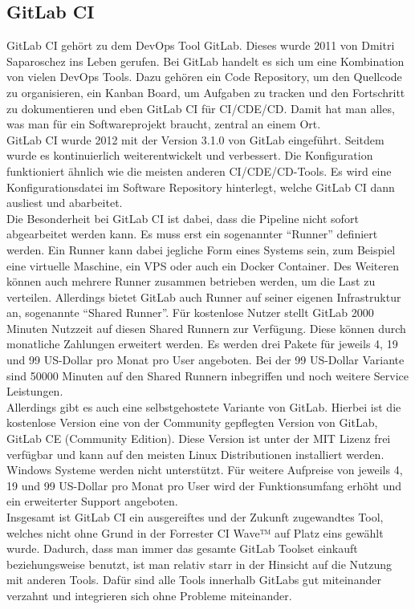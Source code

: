 \subsection{GitLab CI}
GitLab CI gehört zu dem DevOps Tool GitLab\autocite[Vgl.][]{GitLab.2019}. Dieses wurde 2011 von Dmitri Saparoschez ins Leben gerufen. Bei GitLab handelt es sich um eine Kombination von vielen DevOps Tools. Dazu gehören ein Code Repository, um den Quellcode zu organisieren, ein Kanban Board, um Aufgaben zu tracken und den Fortschritt zu dokumentieren und eben GitLab CI für \ac{CI}/\ac{CDE}/\ac{CD}\autocite[Vgl.][]{GitLab.2019}. Damit hat man alles, was man für ein Softwareprojekt braucht, zentral an einem Ort.\\ 
GitLab CI wurde 2012 mit der Version 3.1.0 von GitLab eingeführt\autocite[Vgl.][]{GitLab.2019}. Seitdem wurde es kontinuierlich weiterentwickelt und verbessert. Die Konfiguration funktioniert ähnlich wie die meisten anderen \ac{CI}/\ac{CDE}/\ac{CD}-Tools. Es wird eine Konfigurationsdatei im Software Repository hinterlegt, welche GitLab CI dann ausliest und abarbeitet.\\
 Die Besonderheit bei GitLab CI ist dabei, dass die Pipeline nicht sofort abgearbeitet werden kann. Es muss erst ein sogenannter \enquote{Runner} definiert werden. Ein Runner kann dabei jegliche Form eines Systems sein, zum Beispiel eine virtuelle Maschine, ein VPS oder auch ein Docker Container. Des Weiteren können auch mehrere Runner zusammen betrieben werden, um die Last zu verteilen. Allerdings bietet GitLab auch Runner auf seiner eigenen Infrastruktur an, sogenannte \enquote{Shared Runner}. Für kostenlose Nutzer stellt GitLab 2000 Minuten Nutzzeit auf diesen Shared Runnern zur Verfügung. Diese können durch monatliche Zahlungen erweitert werden. Es werden drei Pakete für jeweils 4, 19 und 99 US-Dollar pro Monat pro User angeboten. Bei der 99 US-Dollar Variante sind 50000 Minuten auf den Shared Runnern inbegriffen und noch weitere Service Leistungen.\autocite[Vgl.][]{GitLab.2019}\\
Allerdings gibt es auch eine selbstgehostete Variante von GitLab. Hierbei ist die kostenlose Version eine von der Community gepflegten Version von GitLab, GitLab CE (Community Edition).\autocite[Vgl.][]{GitLab.2019} Diese Version ist unter der MIT Lizenz frei verfügbar und kann auf den meisten Linux Distributionen installiert werden. Windows Systeme werden nicht unterstützt. Für weitere Aufpreise von jeweils 4, 19 und 99 US-Dollar pro Monat pro User wird der Funktionsumfang erhöht und ein erweiterter Support angeboten.\autocite[Vgl.][]{GitLab.2019}\\
Insgesamt ist GitLab CI ein ausgereiftes und der Zukunft zugewandtes Tool, welches nicht ohne Grund in der Forrester CI Wave™ auf Platz eins gewählt wurde\autocite[Vgl.][]{Forrester.2017}. Dadurch, dass man immer das gesamte GitLab Toolset einkauft beziehungsweise benutzt, ist man relativ starr in der Hinsicht auf die Nutzung mit anderen Tools. Dafür sind alle Tools innerhalb GitLabs gut miteinander verzahnt und integrieren sich ohne Probleme miteinander.\\ 
